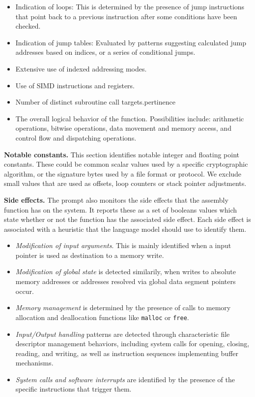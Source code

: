 \begin{itemize}
\item Indication of loops: This is determined by the presence of jump instructions that point back to a previous
instruction after some conditions have been checked.
\item Indication of jump tables: Evaluated by patterns suggesting calculated jump addresses based on
indices, or a series of conditional jumps.
\item Extensive use of indexed addressing modes.
\item Use of SIMD instructions and registers.
\item Number of distinct subroutine call targets.pertinence
\item The overall logical behavior of the function. Possibilities include: arithmetic operations, bitwise operations, data movement and memory access,
and control flow and dispatching operations.
\end{itemize}

\noindent \textbf{Notable constants.}
This section identifies notable integer and floating point constants.  These could be common scalar values used by
a specific cryptographic algorithm, or the signature bytes used by a file format or protocol. We exclude small
values that are used as offsets, loop counters or stack pointer adjustments.

\noindent \textbf{Side effects.}
The prompt also monitors the side effects that the assembly function has on the system.
It reports these as a set of booleans values which state whether or not the function has
the associated side effect. Each side effect is associated with a heuristic that the language model
should use to identify them.

\begin{itemize}
    \item \textit{Modification of input arguments}. This is mainly identified when a input pointer is used as destination to a memory write.
    \item \textit{Modification of global state} is detected similarily, when writes to absolute memory addresses or addresses resolved via global
        data segment pointers occur.
    \item \textit{Memory management} is determined by the presence of calls to memory allocation and deallocation
        functions like \texttt{malloc} or \texttt{free}.
    \item \textit{Input/Output handling} patterns are detected through characteristic file descriptor management behaviors, including system calls for opening, closing, reading, and writing, as well as instruction sequences implementing buffer mechanisms.
    \item \textit{System calls and software interrupts} are identified by the presence of the specific instructions that trigger them.
\end{itemize}

